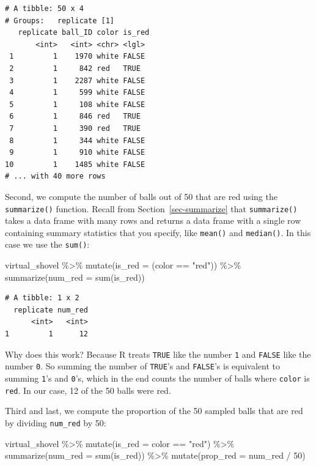 \documentclass[
  letterpaper,
  DIV=11,
  numbers=noendperiod]{scrreprt}
\newenvironment{Shaded}{\begin{snugshade}}{\end{snugshade}}
\newcommand{\AttributeTok}[1]{\textcolor[rgb]{0.40,0.45,0.13}{#1}}
\newcommand{\DecValTok}[1]{\textcolor[rgb]{0.68,0.00,0.00}{#1}}
\newcommand{\FunctionTok}[1]{\textcolor[rgb]{0.28,0.35,0.67}{#1}}
\newcommand{\NormalTok}[1]{\textcolor[rgb]{0.00,0.23,0.31}{#1}}
\newcommand{\SpecialCharTok}[1]{\textcolor[rgb]{0.37,0.37,0.37}{#1}}
\newcommand{\StringTok}[1]{\textcolor[rgb]{0.13,0.47,0.30}{#1}}
\theoremstyle{definition}
\theoremstyle{remark}
\begin{document}
\begin{verbatim}
# A tibble: 50 x 4
# Groups:   replicate [1]
   replicate ball_ID color is_red
       <int>   <int> <chr> <lgl> 
 1         1    1970 white FALSE 
 2         1     842 red   TRUE  
 3         1    2287 white FALSE 
 4         1     599 white FALSE 
 5         1     108 white FALSE 
 6         1     846 red   TRUE  
 7         1     390 red   TRUE  
 8         1     344 white FALSE 
 9         1     910 white FALSE 
10         1    1485 white FALSE 
# ... with 40 more rows
\end{verbatim}

Second, we compute the number of balls out of 50 that are red using the
\texttt{summarize()} function. Recall from Section~\ref{sec-summarize}
that \texttt{summarize()} takes a data frame with many rows and returns
a data frame with a single row containing summary statistics that you
specify, like \texttt{mean()} and \texttt{median()}. In this case we use
the \texttt{sum()}:

\begin{Shaded}
\begin{Highlighting}[]
\NormalTok{virtual\_shovel }\SpecialCharTok{\%\textgreater{}\%} 
  \FunctionTok{mutate}\NormalTok{(}\AttributeTok{is\_red =}\NormalTok{ (color }\SpecialCharTok{==} \StringTok{"red"}\NormalTok{)) }\SpecialCharTok{\%\textgreater{}\%} 
  \FunctionTok{summarize}\NormalTok{(}\AttributeTok{num\_red =} \FunctionTok{sum}\NormalTok{(is\_red))  }
\end{Highlighting}
\end{Shaded}

\begin{verbatim}
# A tibble: 1 x 2
  replicate num_red
      <int>   <int>
1         1      12
\end{verbatim}

Why does this work? Because R treats \texttt{TRUE} like the number
\texttt{1} and \texttt{FALSE} like the number \texttt{0}. So summing the
number of \texttt{TRUE}'s and \texttt{FALSE}'s is equivalent to summing
\texttt{1}'s and \texttt{0}'s, which in the end counts the number of
balls where \texttt{color} is \texttt{red}. In our case, 12 of the 50
balls were red.

Third and last, we compute the proportion of the 50 sampled balls that
are red by dividing \texttt{num\_red} by 50:

\begin{Shaded}
\begin{Highlighting}[]
\NormalTok{virtual\_shovel }\SpecialCharTok{\%\textgreater{}\%} 
  \FunctionTok{mutate}\NormalTok{(}\AttributeTok{is\_red =}\NormalTok{ color }\SpecialCharTok{==} \StringTok{"red"}\NormalTok{) }\SpecialCharTok{\%\textgreater{}\%} 
  \FunctionTok{summarize}\NormalTok{(}\AttributeTok{num\_red =} \FunctionTok{sum}\NormalTok{(is\_red)) }\SpecialCharTok{\%\textgreater{}\%} 
  \FunctionTok{mutate}\NormalTok{(}\AttributeTok{prop\_red =}\NormalTok{ num\_red }\SpecialCharTok{/} \DecValTok{50}\NormalTok{)}
\end{Highlighting}
\end{Shaded}
\end{document}
